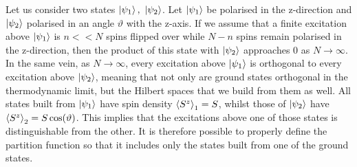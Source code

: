 \documentclass[../fstates.tex,../../main.tex]{subfiles}
\begin{document}
Let us consider two states $\ket{\psi_{1}},\ \ket{\psi_{2}}$. Let $\ket{\psi_{1}}$ be polarised in the z-direction and $\ket{\psi_{2}}$ polarised in an angle $\vartheta$ with the z-axis. If we assume that a finite excitation above $\ket{\psi_{1}}$ is $n<<N$ spins flipped over while $N-n$ spins remain polarised in the z-direction, then the product of this state with $\ket{\psi_{2}}$ approaches 0 as $N\rightarrow\infty$. In the same vein, as $N\rightarrow\infty$, every excitation above $\ket{\psi_{1}}$ is orthogonal to every excitation above $\ket{\psi_{2}}$, meaning that not only are ground states orthogonal in the thermodynamic limit, but the Hilbert spaces that we build from them as well. All states built from $\ket{\psi_{1}}$ have spin density $\expval{S^{z}}_{1}=S$, whilst those of $\ket{\psi_{2}}$ have $\expval{S^{z}}_{2}=S\cos(\vartheta)$. This implies that the excitations above one of those states is distinguishable from the other. It is therefore possible to properly define the partition function so that it includes only the states built from one of the ground states.
\end{document}
